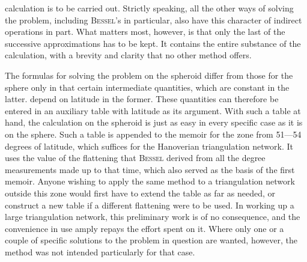 %
calculation is to be carried out. Strictly speaking, all the other ways of solving the problem, including \textsc{Bessel}'s in particular, also have this character of indirect operations in part. What matters most, however, is that only the last of the successive approximations has to be kept. It contains the entire substance of the calculation, with a brevity and clarity that no other method offers.

The formulas for solving the problem on the spheroid differ from those for the sphere only in that certain intermediate quantities, which are constant in the latter. depend on latitude in the former. These quantities can therefore be entered in an auxiliary table with latitude as its argument. With such a table at hand, the calculation on the spheroid is just as easy in every specific case as it is on the sphere. Such a table is appended to the memoir for the zone from 51---54 degrees of latitude, which suffices for the Hanoverian triangulation network. It uses the value of the flattening that \textsc{Bessel} derived from all the degree measurements made up to that time, which also served as the basis of the first memoir. Anyone wishing to apply the same method to a triangulation network outside this zone would first have to extend the table as far as needed, or construct a new table if a different flattening were to be used. In working up a large triangulation network, this preliminary work is of no consequence, and the convenience in use amply repays the effort spent on it. Where only one or a couple of specific solutions to the problem in question are wanted, however, the method was not intended particularly for that case.
